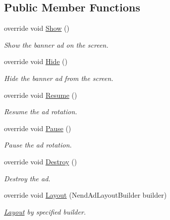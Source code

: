 \subsection*{Public Member Functions}
\begin{DoxyCompactItemize}
\item 
override void \hyperlink{class_nend_unity_plugin_1_1_a_d_1_1_nend_ad_banner_a5e42a206968be7f5f3c29c1b2b885845}{Show} ()
\begin{DoxyCompactList}\small\item\em Show the banner ad on the screen. \end{DoxyCompactList}\item 
override void \hyperlink{class_nend_unity_plugin_1_1_a_d_1_1_nend_ad_banner_a56ba47b195b372d506528e794da9f821}{Hide} ()
\begin{DoxyCompactList}\small\item\em Hide the banner ad from the screen. \end{DoxyCompactList}\item 
override void \hyperlink{class_nend_unity_plugin_1_1_a_d_1_1_nend_ad_banner_a9a51b9934b54295418c9a2694abc6b65}{Resume} ()
\begin{DoxyCompactList}\small\item\em Resume the ad rotation. \end{DoxyCompactList}\item 
override void \hyperlink{class_nend_unity_plugin_1_1_a_d_1_1_nend_ad_banner_a046725552963ff5138bf0ddb6e838a80}{Pause} ()
\begin{DoxyCompactList}\small\item\em Pause the ad rotation. \end{DoxyCompactList}\item 
override void \hyperlink{class_nend_unity_plugin_1_1_a_d_1_1_nend_ad_banner_a97d8bf6fc3fb5b5893b51fa0461fab59}{Destroy} ()
\begin{DoxyCompactList}\small\item\em Destroy the ad. \end{DoxyCompactList}\item 
override void \hyperlink{class_nend_unity_plugin_1_1_a_d_1_1_nend_ad_banner_a742d07c25727bb33e787c937151fb1e3}{Layout} (Nend\+Ad\+Layout\+Builder builder)
\begin{DoxyCompactList}\small\item\em \hyperlink{namespace_nend_unity_plugin_1_1_layout}{Layout} by specified builder. \end{DoxyCompactList}\end{DoxyCompactItemize}
